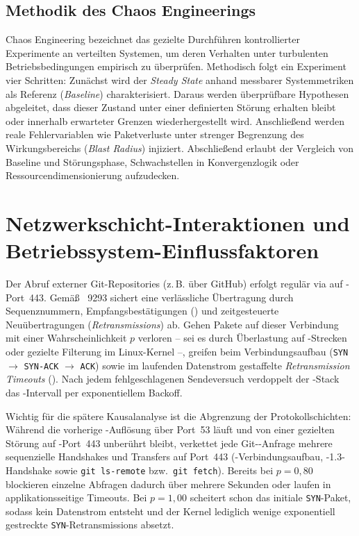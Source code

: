 \subsection{Methodik des Chaos Engineerings}
\label{subsec:methodik-chaos-engineering}

Chaos Engineering bezeichnet das gezielte Durchführen kontrollierter Experimente an verteilten Systemen, um deren Verhalten unter turbulenten Betriebsbedingungen empirisch zu überprüfen.\autocite{basiri_chaos_2016} Methodisch folgt ein Experiment vier Schritten: Zunächst wird der \textit{Steady State} anhand messbarer Systemmetriken als Referenz (\textit{Baseline}) charakterisiert. Daraus werden überprüfbare Hypothesen abgeleitet, dass dieser Zustand unter einer definierten Störung erhalten bleibt oder innerhalb erwarteter Grenzen wiederhergestellt wird. Anschließend werden reale Fehlervariablen wie Paketverluste unter strenger Begrenzung des Wirkungsbereichs (\textit{Blast Radius}) injiziert. Abschließend erlaubt der Vergleich von Baseline und Störungsphase, Schwachstellen in Konvergenzlogik oder Ressourcendimensionierung aufzudecken.

\section{Netzwerkschicht-Interaktionen und Betriebssystem-Einflussfaktoren}
\label{sec:netzwerkschicht-betriebssystem}

Der Abruf externer Git-Repositories (z.\,B. über GitHub) erfolgt regulär via  auf -Port~443. Gemäß ~9293 sichert  eine verlässliche Übertragung durch Sequenznummern, Empfangsbestätigungen () und zeitgesteuerte Neuübertragungen (\textit{Retransmissions}) ab.\autocite{eddy_rfc9293_2022} Gehen Pakete auf dieser Verbindung mit einer Wahrscheinlichkeit $p$ verloren -- sei es durch Überlastung auf -Strecken oder gezielte Filterung im Linux-Kernel --, greifen beim Verbindungsaufbau (\texttt{SYN} $\rightarrow$ \texttt{SYN-ACK} $\rightarrow$ \texttt{ACK}) sowie im laufenden Datenstrom gestaffelte \textit{Retransmission Timeouts} (). Nach jedem fehlgeschlagenen Sendeversuch verdoppelt der -Stack das -Intervall per exponentiellem Backoff.\autocite{eddy_rfc9293_2022}

Wichtig für die spätere Kausalanalyse ist die Abgrenzung der Protokollschichten: Während die vorherige -Auflösung über Port~53 läuft und von einer gezielten Störung auf -Port~443 unberührt bleibt, verkettet jede Git--Anfrage mehrere sequenzielle Handshakes und Transfers auf Port~443 (-Verbindungs\-aufbau, -1.3-Hand\-shake sowie \texttt{git ls-remote} bzw.\ \texttt{git fetch}). Bereits bei $p = 0{,}80$ blockieren einzelne Abfragen dadurch über mehrere Sekunden oder laufen in applikationsseitige Timeouts. Bei $p = 1{,}00$ scheitert schon das initiale \texttt{SYN}-Paket, sodass kein Datenstrom entsteht und der Kernel lediglich wenige exponentiell gestreckte \texttt{SYN}-Retransmissions absetzt.

